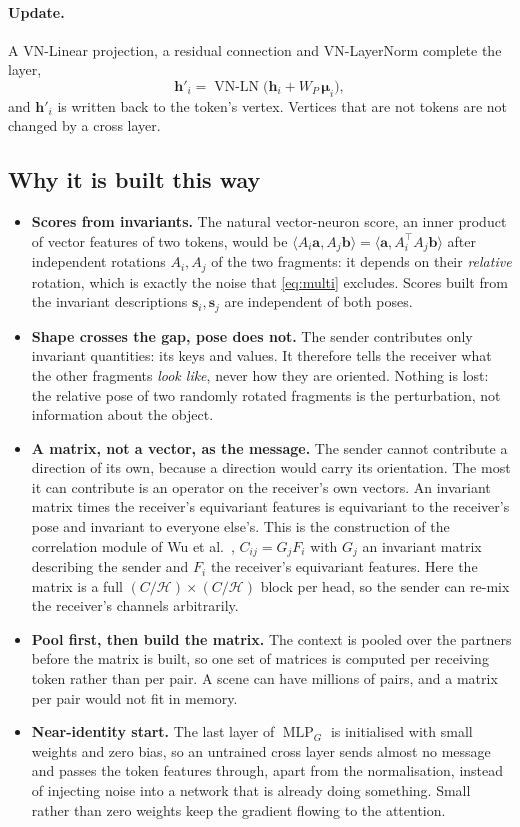 \documentclass[11pt,a4paper]{article}
\theoremstyle{remark}
\newcommand{\T}{^{\top}}
\newcommand{\ip}[2]{\langle #1,#2\rangle}
\DeclareMathOperator{\MLP}{MLP}
\begin{document}
\paragraph{Update.} A VN-Linear projection, a residual connection and VN-LayerNorm complete the layer,
\begin{equation}
  \mathbf h'_i=\operatorname{VN\text{-}LN}\big(\mathbf h_i+W_P\,\boldsymbol\mu_i\big),
\end{equation}
and $\mathbf h'_i$ is written back to the token's vertex. Vertices that are not tokens are not changed by a cross layer.

\subsection{Why it is built this way}
\begin{itemize}
  \item \textbf{Scores from invariants.} The natural vector-neuron score, an inner product of vector features of two tokens, would be $\ip{A_i\mathbf a}{A_j\mathbf b}=\ip{\mathbf a}{A_i\T A_j\mathbf b}$ after independent rotations $A_i,A_j$ of the two fragments: it depends on their \emph{relative} rotation, which is exactly the noise that \cref{eq:multi} excludes. Scores built from the invariant descriptions $\mathbf s_i,\mathbf s_j$ are independent of both poses.
  \item \textbf{Shape crosses the gap, pose does not.} The sender contributes only invariant quantities: its keys and values. It therefore tells the receiver what the other fragments \emph{look like}, never how they are oriented. Nothing is lost: the relative pose of two randomly rotated fragments is the perturbation, not information about the object.
  \item \textbf{A matrix, not a vector, as the message.} The sender cannot contribute a direction of its own, because a direction would carry its orientation. The most it can contribute is an operator on the receiver's own vectors. An invariant matrix times the receiver's equivariant features is equivariant to the receiver's pose and invariant to everyone else's. This is the construction of the correlation module of Wu et al.~\cite{wu2023leveraging}, $C_{ij}=G_jF_i$ with $G_j$ an invariant matrix describing the sender and $F_i$ the receiver's equivariant features. Here the matrix is a full $(C/\mathcal H)\times(C/\mathcal H)$ block per head, so the sender can re-mix the receiver's channels arbitrarily.
  \item \textbf{Pool first, then build the matrix.} The context is pooled over the partners before the matrix is built, so one set of matrices is computed per receiving token rather than per pair. A scene can have millions of pairs, and a matrix per pair would not fit in memory.
  \item \textbf{Near-identity start.} The last layer of $\MLP_G$ is initialised with small weights and zero bias, so an untrained cross layer sends almost no message and passes the token features through, apart from the normalisation, instead of injecting noise into a network that is already doing something. Small rather than zero weights keep the gradient flowing to the attention.
\end{itemize}
\end{document}

